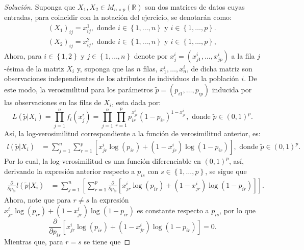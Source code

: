 \documentclass[10.5pt,notitlepage]{article}
\newenvironment{solucion}
  {\begin{proof}[Solución]}
  {\end{proof}}
\newcommand{\RR}{\mathbb{R}}
\newcommand{\corch}[1]{\left[ #1 \right]}
\newcommand{\kis}[1]{\left\{ #1 \right\}}
\newcommand{\pare}[1]{\left( #1 \right)}
\theoremstyle{plain}
\begin{document}
\begin{solucion}
Suponga que \(X_1, X_2 \in M_{n \times p }(\RR)\) son dos matrices de datos cuyas entradas, para coincidir con la notación del ejercicio, se denotarán como:
\begin{align*}
    (X_1)_{ij} = x_{ij}^{1}, \text{ donde } i \in \kis{1, \hdots, n} \text{ y }   i \in \kis{1, \hdots, p}.\\ 
    (X_2)_{ij} = x_{ij}^{2}, \text{ donde } i \in \kis{1, \hdots, n} \text{ y }   i \in \kis{1, \hdots, p},
 \end{align*}
 Ahora, para \(i \in \kis{1, 2}\) y \(j \in \kis{1, \hdots, n}\) denote por \(x_{j}^{i} = (x_{j1}^{i}, \hdots,x_{jp}^{i})\) a la fila \(j\)-ésima de la matriz \(X_{i}\) y, suponga que las \(n\) filas, \(x_{1}^{i}, \hdots, x_{n}^{i}\), de dicha matriz son observaciones independientes de los atributos de individuos de la población \(i\). De este modo, la verosimilitud para los parámetros \(\widetilde{p} =(p_{i1}, \hdots, p_{ip})\) inducida por las observaciones en las filas de \(X_i\), esta dada por: 
 \begin{equation*}
    L\pare{\widetilde{p}|X_{i}} = \prod_{j = 1}^{n}f_{i}(x_{j}^{i}) = \prod_{j = 1}^{n}\prod_{r = 1}^{p}p_{ir}^{x_{jr}^{i}} (1 - p_{ir})^{1 - x_{jr}^{i}}, \text{ donde } \widetilde{p}\in(0,1)^p. 
 \end{equation*}
 Así, la log-verosimilitud correspondiente a la función de verosimilitud anterior, es: 
  \begin{align*}
    l\pare{\widetilde{p}|X_{i}} &= \sum_{j = 1}^{n}\sum_{r = 1}^{p}\corch{x_{jr}^{i}\log(p_{ir}) + (1 - x_{jr}^{i})\log(1 - p_{ir})},\text{ donde } \widetilde{p}\in(0,1)^p. 
 \end{align*}
 Por lo cual, la log-verosimilitud es una función diferenciable en \((0,1)^p\), así, derivando la expresión anterior respecto a \(p_{is}\) con \(s \in \kis{1,\hdots, p}\), se sigue que 
 \begin{align}\label{ladesi3}
     \frac{\partial}{\partial p_{is}} l\pare{\widetilde{p}|X_{i}} &=\sum_{j = 1}^{n}\corch{\sum_{r = 1}^{p}\frac{\partial}{\partial p_{is}}\corch{x_{jr}^{i}\log(p_{ir}) + (1 - x_{jr}^{i})\log(1 - p_{ir})}}.
 \end{align}
 Ahora, note que para \(r \neq s\) la expresión \(x_{jr}^{i}\log(p_{ir}) + (1 - x_{jr}^{i})\log(1 - p_{ir})\) es constante respecto a \(p_{is}\), por lo que
 \[
 \frac{\partial}{\partial p_{is}}\corch{x_{jr}^{i}\log(p_{ir}) + (1 - x_{jr}^{i})\log(1 - p_{ir})} = 0.
 \]
 Mientras que, para \(r = s\) se tiene que 

\end{solucion}
\end{document}

